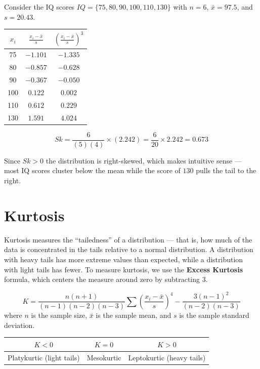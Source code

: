 \documentclass[
  11pt,
  letterpaper,
  DIV=11,
  numbers=noendperiod,
  oneside,
  open=any]{scrreprt}
\begin{document}
\begin{bsexample}[Example]

Consider the IQ scores \(IQ=\{75, 80, 90, 100, 110, 130\}\) with
\(n=6\), \(\bar{x}=97.5\), and \(s=20.43\).

\begin{center}
\begin{tabular}{ccc}
\toprule
\(x_i\) & \(\frac{x_i-\bar{x}}{s}\) & \(\left(\frac{x_i-\bar{x}}{s}\right)^3\) \\
\midrule
75 & \(-1.101\) & \(-1.335\) \\
80 & \(-0.857\) & \(-0.628\) \\
90 & \(-0.367\) & \(-0.050\) \\
100 & \(0.122\) & \(0.002\) \\
110 & \(0.612\) & \(0.229\) \\
130 & \(1.591\) & \(4.024\) \\
\bottomrule
\end{tabular}
\end{center}

\[Sk = \frac{6}{(5)(4)}\times(2.242) = \frac{6}{20}\times 2.242 = 0.673\]

Since \(Sk > 0\) the distribution is right-skewed, which makes intuitive
sense --- most IQ scores cluster below the mean while the score of
\(130\) pulls the tail to the right.

\end{bsexample}

\section{Kurtosis}\label{kurtosis}

Kurtosis measures the ``tailedness'' of a distribution --- that is, how
much of the data is concentrated in the tails relative to a normal
distribution. A distribution with heavy tails has more extreme values
than expected, while a distribution with light tails has fewer. To
measure kurtosis, we use the \textbf{Excess Kurtosis} formula, which
centers the measure around zero by subtracting 3.

\begin{bsformula}

\[K = \frac{n(n+1)}{(n-1)(n-2)(n-3)}\sum\left(\frac{x_i-\bar{x}}{s}\right)^4 - \frac{3(n-1)^2}{(n-2)(n-3)}\]
where \(n\) is the sample size, \(\bar{x}\) is the sample mean, and
\(s\) is the sample standard deviation.

\begin{center}
\begin{tabular}{ccc}
\toprule
\(K < 0\) & \(K = 0\) & \(K > 0\) \\
\midrule
Platykurtic (light tails) & Mesokurtic & Leptokurtic (heavy tails) \\
\bottomrule
\end{tabular}
\end{center}

\end{bsformula}
\end{document}
